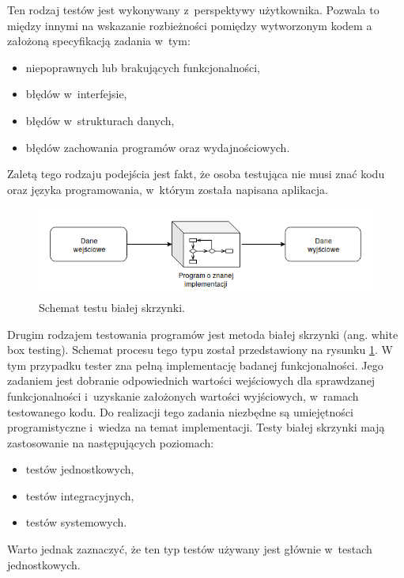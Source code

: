Ten rodzaj testów jest wykonywany z~perspektywy użytkownika.
Pozwala to między innymi na wskazanie rozbieżności pomiędzy wytworzonym kodem a założoną specyfikacją zadania w~tym:
\begin {itemize}
    \item niepoprawnych lub brakujących funkcjonalności,
    \item błędów w~interfejsie,
    \item błędów w~strukturach danych,
    \item błędów zachowania programów oraz wydajnościowych.
\end{itemize}
Zaletą tego rodzaju podejścia jest fakt, że osoba testująca nie musi znać kodu oraz języka programowania, w~którym została napisana aplikacja.

\begin{figure}[h]
    \centering
    \includegraphics[width = 13cm]{chapter02/white-box.png}
    \caption{Schemat testu białej skrzynki.}
    \label{fig:white-box}
\end{figure}

Drugim rodzajem testowania programów jest metoda białej skrzynki (ang. white box testing).
Schemat procesu tego typu został przedstawiony na rysunku \ref{fig:white-box}.
W tym przypadku tester zna pełną implementację badanej funkcjonalności.
Jego zadaniem jest dobranie odpowiednich wartości wejściowych dla sprawdzanej funkcjonalności i~uzyskanie założonych wartości wyjściowych, w~ramach testowanego kodu.
Do realizacji tego zadania niezbędne są umiejętności programistyczne i~wiedza na temat implementacji.
Testy białej skrzynki mają zastosowanie na następujących poziomach:
\begin{itemize}
    \item testów jednostkowych,
    \item testów integracyjnych,
    \item testów systemowych.
\end{itemize}
Warto jednak zaznaczyć, że ten typ testów używany jest głównie w~testach jednostkowych.

